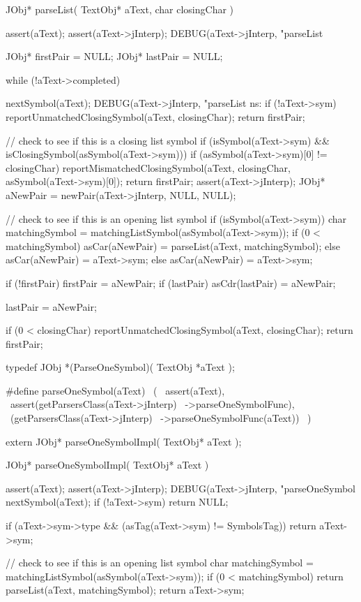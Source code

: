\startCCode
JObj* parseList(
  TextObj* aText,
  char closingChar
) {
  assert(aText);
  assert(aText->jInterp);
  DEBUG(aText->jInterp,
    "parseList %

  JObj* firstPair = NULL;
  JObj* lastPair  = NULL;

  while (!aText->completed) {

    nextSymbol(aText);
    DEBUG(aText->jInterp,
      "parseList ns: %
    if (!aText->sym) {
      reportUnmatchedClosingSymbol(aText, closingChar);
      return firstPair;
    }

    // check to see if this is a closing list symbol
    if (isSymbol(aText->sym) &&
        isClosingSymbol(asSymbol(aText->sym))) {
      if (asSymbol(aText->sym)[0] != closingChar) {
        reportMismatchedClosingSymbol(aText, closingChar,
                                      asSymbol(aText->sym)[0]);
      }
      return firstPair;
    }
    assert(aText->jInterp);
    JObj* aNewPair = newPair(aText->jInterp, NULL, NULL);

    // check to see if this is an opening list symbol
    if (isSymbol(aText->sym)) {
      char matchingSymbol = matchingListSymbol(asSymbol(aText->sym));
      if (0 < matchingSymbol) {
        asCar(aNewPair) = parseList(aText, matchingSymbol);
      } else asCar(aNewPair) = aText->sym;
    } else asCar(aNewPair) = aText->sym;

    if (!firstPair) firstPair       = aNewPair;
    if (lastPair)   asCdr(lastPair) = aNewPair;

    lastPair = aNewPair;
  }

  if (0 < closingChar) reportUnmatchedClosingSymbol(aText, closingChar);
  return firstPair;
}
\stopCCode


\startCHeader
typedef JObj *(ParseOneSymbol)(
  TextObj *aText
);

#define parseOneSymbol(aText)               \
  (                                         \
    assert(aText),                          \
    assert(getParsersClass(aText->jInterp)  \
      ->parseOneSymbolFunc),                \
    (getParsersClass(aText->jInterp)        \
      ->parseOneSymbolFunc(aText))          \
  )
\stopCHeader

\setCHeaderStream{private}
\startCHeader
extern JObj* parseOneSymbolImpl(
  TextObj* aText
);
\stopCHeader
{}

\startCCode
JObj* parseOneSymbolImpl(
  TextObj* aText
) {
  assert(aText);
  assert(aText->jInterp);
  DEBUG(aText->jInterp, "parseOneSymbol %
  nextSymbol(aText);
  if (!aText->sym) return NULL;

  if (aText->sym->type &&
     (asTag(aText->sym) != SymbolsTag)) return aText->sym;

  // check to see if this is an opening list symbol
  char matchingSymbol = matchingListSymbol(asSymbol(aText->sym));
  if (0 < matchingSymbol) {
    return parseList(aText, matchingSymbol);
  }
  return aText->sym;
}
\stopCCode

